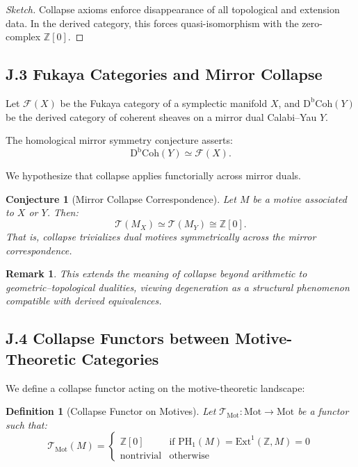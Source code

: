 \documentclass[11pt]{article}
\newtheorem{definition}[theorem]{Definition}
\newtheorem{remark}[theorem]{Remark}
\newtheorem{conjecture}{Conjecture}[section]
\begin{document}
\begin{proof}[Sketch]
Collapse axioms enforce disappearance of all topological and extension data.  
In the derived category, this forces quasi-isomorphism with the zero-complex $\mathbb{Z}[0]$.
\end{proof}

\subsection*{J.3 Fukaya Categories and Mirror Collapse}

Let $\mathcal{F}(X)$ be the Fukaya category of a symplectic manifold $X$, and $\mathrm{D^bCoh}(Y)$ be the derived category of coherent sheaves  
on a mirror dual Calabi–Yau $Y$.

The homological mirror symmetry conjecture asserts:
\[
\mathrm{D^bCoh}(Y) \simeq \mathcal{F}(X).
\]

We hypothesize that collapse applies functorially across mirror duals.

\begin{conjecture}[Mirror Collapse Correspondence]
Let $M$ be a motive associated to $X$ or $Y$. Then:
\[
\mathcal{T}(M_X) \simeq \mathcal{T}(M_Y) \cong \mathbb{Z}[0].
\]
That is, collapse trivializes dual motives symmetrically across the mirror correspondence.
\end{conjecture}

\begin{remark}
This extends the meaning of collapse beyond arithmetic to geometric–topological dualities,  
viewing degeneration as a structural phenomenon compatible with derived equivalences.
\end{remark}

\subsection*{J.4 Collapse Functors between Motive-Theoretic Categories}

We define a collapse functor acting on the motive-theoretic landscape:

\begin{definition}[Collapse Functor on Motives]
Let $\mathcal{T}_{\mathrm{Mot}} : \text{Mot} \to \text{Mot}$ be a functor such that:
\[
\mathcal{T}_{\mathrm{Mot}}(M) =
\begin{cases}
\mathbb{Z}[0] & \text{if } \mathrm{PH}_1(M) = \mathrm{Ext}^1(\mathbb{Z}, M) = 0 \\
\text{nontrivial} & \text{otherwise}
\end{cases}
\]
\end{definition}
\end{document}
